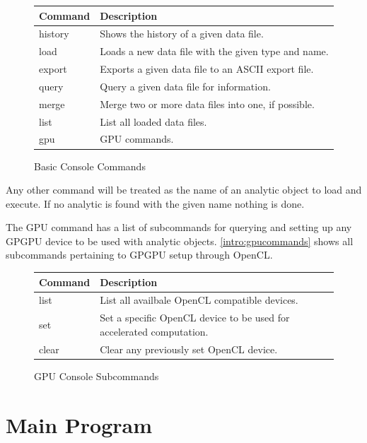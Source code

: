 \documentclass[10pt]{article}
\begin{document}
\begin{figure}[H]
\begin{mdframed}[style=btable]
\begin{tabularx}{\textwidth}{|l|X|}
\hline
\textbf{Command} & \textbf{Description} \\
\hline
history & Shows the history of a given data file. \\
\hline
load & Loads a new data file with the given type and name. \\
\hline
export & Exports a given data file to an ASCII export file. \\
\hline
query & Query a given data file for information. \\
\hline
merge & Merge two or more data files into one, if possible. \\
\hline
list & List all loaded data files. \\
\hline
gpu & GPU commands. \\
\hline
\end{tabularx}
\end{mdframed}
\caption{Basic Console Commands}
\label{intro:ccommands}
\end{figure}

Any other command will be treated as the name of an analytic object to load and 
execute. If no analytic is found with the given name nothing is done.

The GPU command has a list of subcommands for querying and setting up any GPGPU 
device to be used with analytic objects. \autoref{intro:gpucommands} shows all 
subcommands pertaining to GPGPU setup through OpenCL.

\begin{figure}[H]
\begin{mdframed}[style=btable]
\begin{tabularx}{\textwidth}{|l|X|}
\hline
\textbf{Command} & \textbf{Description} \\
\hline
list & List all availbale OpenCL compatible devices. \\
\hline
set & Set a specific OpenCL device to be used for accelerated computation. \\
\hline
clear & Clear any previously set OpenCL device. \\
\hline
\end{tabularx}
\end{mdframed}
\caption{GPU Console Subcommands}
\label{intro:gpucommands}
\end{figure}

\newpage
\section{Main Program}
\end{document}
